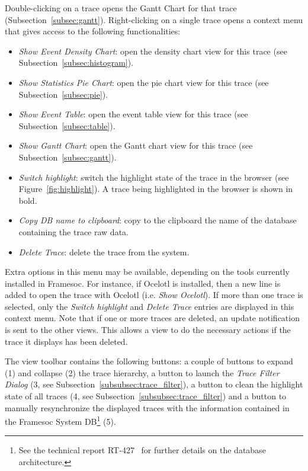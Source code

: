 \documentclass[twoside]{article}
\begin{document}
\begin{sloppypar}
Double-clicking on a trace opens the Gantt Chart for that trace (Subsection~\ref{subsec:gantt}).
Right-clicking on a single trace opens a context menu that gives access to the following functionalities:
\begin{itemize}
 \item \emph{Show Event Density Chart}: open the density chart view for this trace (see Subsection~\ref{subsec:histogram}).
 \item \emph{Show Statistics Pie Chart}: open the pie chart view for this trace (see Subsection~\ref{subsec:pie}).
 \item \emph{Show Event Table}: open the event table view for this trace (see Subsection~\ref{subsec:table}).
 \item \emph{Show Gantt Chart}: open the Gantt chart view for this trace (see Subsection~\ref{subsec:gantt}).
 \item \emph{Switch highlight}: switch the highlight state of the trace in the browser (see Figure~\ref{fig:highlight}). A trace being highlighted in the browser is shown in bold.
 \item \emph{Copy DB name to clipboard}: copy to the clipboard the name of the database containing the trace raw data.
 \item \emph{Delete Trace}: delete the trace from the system.
\end{itemize}
Extra options in this menu may be available, depending on the tools currently installed in Framesoc. For instance, if Ocelotl is installed, then a new line is added to open the trace with Ocelotl (i.e. \emph{Show Ocelotl}).
If more than one trace is selected, only the \emph{Switch highlight} and \emph{Delete Trace} entries are displayed in this context menu.
Note that if one or more traces are deleted, an update notification is sent to the other views.
This allows a view to do the necessary actions if the trace it displays has been deleted.

The view toolbar contains the following buttons: a couple of buttons to expand (\num{1}) and collapse (\num{2}) the trace hierarchy, a button to launch the \emph{Trace Filter Dialog} (\num{3}, see Subsection~\ref{subsubsec:trace_filter}), a button to clean the highlight state of all traces (\num{4}, see Subsection~\ref{subsubsec:trace_filter}) and a button to manually resynchronize the displayed traces with the information contained in the Framesoc System DB\footnote{See the technical report RT-427~\cite{pagano:hal} for further details on the database architecture.} (\num{5}).


\end{sloppypar}
\end{document}
